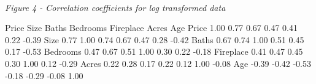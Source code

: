 \documentclass[10pt,A4,makeidx]{article}
\begin{document}
  \emph{\\Figure 4 - Correlation coefficients for log transformed data}
  \begin{Soutput}
              Price  Size Baths Bedrooms Fireplace Acres   Age
    Price      1.00  0.77  0.67     0.47      0.41  0.22 -0.39
    Size       0.77  1.00  0.74     0.67      0.47  0.28 -0.42
    Baths      0.67  0.74  1.00     0.51      0.45  0.17 -0.53
    Bedrooms   0.47  0.67  0.51     1.00      0.30  0.22 -0.18
    Fireplace  0.41  0.47  0.45     0.30      1.00  0.12 -0.29
    Acres      0.22  0.28  0.17     0.22      0.12  1.00 -0.08
    Age       -0.39 -0.42 -0.53    -0.18     -0.29 -0.08  1.00
  \end{Soutput}
\end{document}
